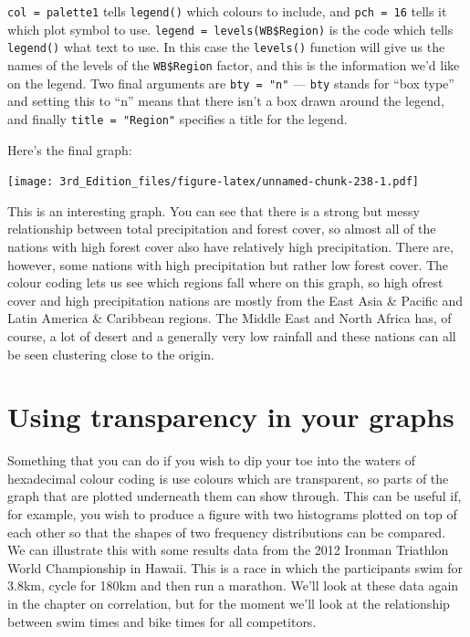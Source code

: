 \documentclass[
]{book}
\begin{document}
\texttt{col\ =\ palette1} tells \texttt{legend()} which colours to include, and \texttt{pch\ =\ 16} tells it which plot symbol to use. \texttt{legend\ =\ levels(WB\$Region)} is the code which tells \texttt{legend()} what text to use. In this case the \texttt{levels()} function will give us the names of the levels of the \texttt{WB\$Region} factor, and this is the information we'd like on the legend. Two final arguments are \texttt{bty\ =\ "n"} --- \texttt{bty} stands for ``box type'' and setting this to ``n'' means that there isn't a box drawn around the legend, and finally \texttt{title\ =\ "Region"} specifies a title for the legend.

Here's the final graph:

\texttt{[image: 3rd\_Edition\_files/figure-latex/unnamed-chunk-238-1.pdf]}

This is an interesting graph. You can see that there is a strong but messy relationship between total precipitation and forest cover, so almost all of the nations with high forest cover also have relatively high precipitation. There are, however, some nations with high precipitation but rather low forest cover. The colour coding lets us see which regions fall where on this graph, so high ofrest cover and high precipitation nations are mostly from the East Asia \& Pacific and Latin America \& Caribbean regions. The Middle East and North Africa has, of course, a lot of desert and a generally very low rainfall and these nations can all be seen clustering close to the origin.

\hypertarget{using-transparency-in-your-graphs}{%
\section{Using transparency in your graphs}\label{using-transparency-in-your-graphs}}

Something that you can do if you wish to dip your toe into the waters of hexadecimal colour coding is use colours which are transparent, so parts of the graph that are plotted underneath them can show through. This can be useful if, for example, you wish to produce a figure with two histograms plotted on top of each other so that the shapes of two frequency distributions can be compared. We can illustrate this with some results data from the 2012 Ironman Triathlon World Championship in Hawaii. This is a race in which the participants swim for 3.8km, cycle for 180km and then run a marathon. We'll look at these data again in the chapter on correlation, but for the moment we'll look at the relationship between swim times and bike times for all competitors.
\end{document}
